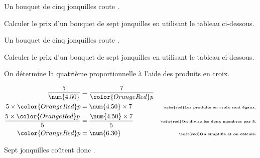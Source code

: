 \begin{exercice*}
    Un bouquet de cinq jonquilles coute .\par
    Calculer le prix d'un bouquet de sept jonquilles en utilisant le tableau ci-dessous.
    \begin{center}
    \end{center}
\end{exercice*}
\begin{corrige}
    Un bouquet de cinq jonquilles coute .\par
    Calculer le prix d'un bouquet de sept jonquilles en utilisant le tableau ci-dessous.
    \begin{center}
    \end{center}
    {\color{red}
        On détermine la quatrième proportionnelle à l'aide des produits en croix.
    }
    \Coupe
    {\color{red}
        \begin{align*}
            \dfrac{5}{\num{4.50}}                       &=\dfrac{7}{\color{OrangeRed} p}&\\
            5\times {\color{OrangeRed} p}               &= \num{4.50}\times 7           &\text{\tiny\bfseries\color{red}Les produits en croix sont égaux.}\\
            \dfrac{5\times {\color{OrangeRed} p}}{5}    &= \dfrac{\num{4.50}\times 7}{5}&\text{\tiny\bfseries\color{red}On divise les deux membres par 5.}\\
            {\color{OrangeRed} p}                       &=\num{6.30}                    &\text{\tiny\bfseries\color{red}On simplifie et on calcule.}
        \end{align*}
        \par\smallskip
        Sept jonquilles coûtent donc .
    }
\end{corrige}

